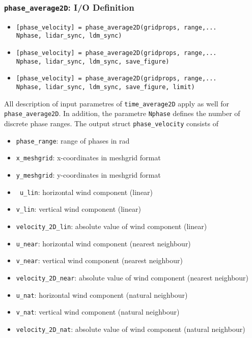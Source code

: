 \documentclass[
12pt,
a4paper,
twoside]
{article}
\begin{document}
\subsubsection{\texttt{phase\_{}average2D}: I/O Definition}
\begin{itemize}
\item \verb![phase_velocity] = phase_average2D(gridprops, range,...!\\
\verb!Nphase, lidar_sync, ldm_sync)!
\item \verb![phase_velocity] = phase_average2D(gridprops, range,...!\\
\verb!Nphase, lidar_sync, ldm_sync, save_figure)!
\item \verb![phase_velocity] = phase_average2D(gridprops, range,...!\\
\verb!Nphase, lidar_sync, ldm_sync, save_figure, limit)!
\end{itemize}
All description of input parametres of \verb!time_average2D! apply as well for\\ \verb!phase_average2D!. In addition, the parametre \verb!Nphase! defines the number of discrete phase ranges. The output struct \verb!phase_velocity! consists of
\begin{itemize}
\item \verb!phase_range!: range of phases in rad
\item \verb!x_meshgrid!: x-coordinates in meshgrid format
\item \verb!y_meshgrid!: y-coordinates in meshgrid format
\item \verb! u_lin!: horizontal wind component (linear)
\item \verb!v_lin!: vertical wind component (linear)
\item \verb!velocity_2D_lin!: absolute value of wind component (linear)
\item \verb!u_near!: horizontal wind component (nearest neighbour)
\item \verb!v_near!: vertical wind component (nearest neighbour)
\item \verb!velocity_2D_near!: absolute value of wind component (nearest neighbour)
\item \verb!u_nat!: horizontal wind component (natural neighbour)
\item \verb!v_nat!: vertical wind component (natural neighbour)
\item \verb!velocity_2D_nat!: absolute value of wind component (natural neighbour)
\end{itemize}
\end{document}
